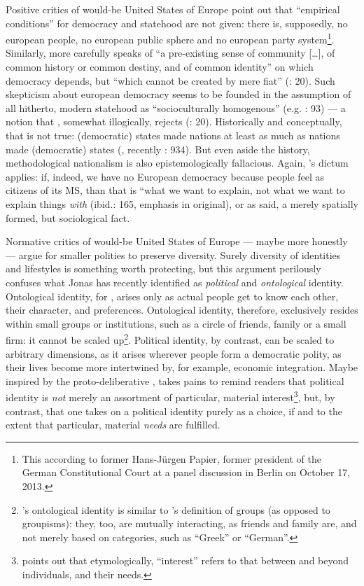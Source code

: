 \documentclass[11pt,a4paper,oneside,openright]{article}
\begin{document}
Positive critics of would-be United States of Europe point out that ``empirical conditions'' for democracy and statehood are not given: 
there is, supposedly, no european people, no european public sphere and no european party system\footnote{
	This according to former Hans-J\"{u}rgen Papier, former president of the German Constitutional Court at a panel discussion in Berlin on October 17, 2013.}.
Similarly, \citeauthor{Scharpf1997} more carefully 	speaks of ``a pre-existing sense of community [\ldots], of common history or common destiny, and of common identity'' on which democracy depends, but ``which cannot be created by mere fiat'' (\citeyear{Scharpf1997}: 20).
Such skepticism about european democracy seems to be founded in the assumption of all hitherto, modern statehood as ``socioculturally homogenous'' (e.g. \citealt{BeckGrande-2007-aa}: 93) --- a notion that \citeauthor{Scharpf1997}, somewhat illogically, rejects (\citeyear{Scharpf1997}: 20). 
Historically and conceptually, that is not true: 
(democratic) states made nations at least as much as nations made (democratic) states (\citealt{Gellner-1983-aa}, recently \citealt{Schmitter1999}: 934). 
But even aside the history, methodological nationalism is also epistemologically fallacious. 
Again, \citeauthor{Brubaker-2002-aa}'s dictum applies: 
if, indeed, we have no European democracy because people feel as citizens of its \gls{MS}, than that is ``what we want to explain, not what we want to explain things \emph{with} (ibid.: 165, emphasis in original), or as \citeauthor{Simmel1903} said, a merely spatially formed, but sociological fact.

Normative critics of would-be United States of Europe --- maybe more honestly --- argue for smaller polities to preserve diversity. 
Surely diversity of identities and lifestyles is something worth protecting, but this argument perilously confuses what Jonas \cite{Marx2012} has recently identified as \emph{political} and \emph{ontological} identity. 
Ontological identity, for \citeauthor{Marx2012}, arises only as actual people get to know each other, their character, and preferences. 
Ontological identity, therefore, exclusively resides within small groups or institutions, such as a circle of friends, family or a small firm: 
it cannot be scaled up\footnote{
	\cite{Marx2012}'s ontological identity is similar to \cite{Brubaker-2002-aa}'s definition of groups (as opposed to groupisms):
	they, too, are mutually interacting, as friends and family are, and not merely based on categories, such as ``Greek'' or ``German''.}.
Political identity, by contrast, can be scaled to arbitrary dimensions, as it arises wherever people form a democratic polity, as their lives become more intertwined by, for example, economic integration. 
Maybe inspired by the proto-deliberative \cite{Ahrendt1958}, \citeauthor{Marx2012} takes pains to remind readers that political identity is \emph{not} merely an assortment of particular, material interest\footnote{
	\citeauthor{Marx2012} points out that etymologically, ``interest'' refers to that between and beyond individuals, and their needs.}, 
but, by contrast, that one takes on a political identity purely as a choice, if and to the extent that particular, material \emph{needs} are fulfilled. 
\end{document}
